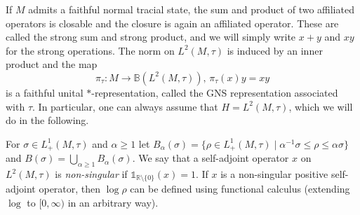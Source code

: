 \documentclass[12pt,a4paper]{amsart}
\newcommand{\1}{\mathds{1}}
\renewcommand{\L}{\mathcal L}
\newcommand{\IB}{\mathbb B}
\newcommand{\IR}{\mathbb R}
\theoremstyle{plain}
\newtheorem{lemma}[proposition]{Lemma}
\theoremstyle{definition}
\theoremstyle{remark}
\begin{document}
If $M$ admits a faithful normal tracial state, the sum and product of two affiliated operators is closable and the closure is again an affiliated operator. These are called the strong sum and strong product, and we will simply write $x+y$ and $xy$ for the strong operations. The norm on $L^2(M,\tau)$ is induced by an inner product and the map
\begin{equation*}
    \pi_\tau\colon M\to \IB(L^2(M,\tau)),\,\pi_\tau(x)y=xy
\end{equation*}
is a faithful unital $\ast$-representation, called the GNS representation associated with $\tau$. In particular, one can always assume that $H=L^2(M,\tau)$, which we will do in the following.

For $\sigma\in L^1_+(M,\tau)$ and $\alpha\geq 1$ let $B_\alpha(\sigma)=\{\rho\in L^1_+(M,\tau)\mid \alpha^{-1}\sigma\leq \rho\leq \alpha \sigma\}$ and $B(\sigma)=\bigcup_{\alpha\geq 1}B_\alpha(\sigma)$. We say that a self-adjoint operator $x$ on $L^2(M,\tau)$ is \emph{non-singular} if $\1_{\IR\setminus \{0\}}(x)=1$. If $x$ is a non-singular positive self-adjoint operator, then $\log \rho$ can be defined using functional calculus (extending $\log$ to $[0,\infty)$ in an arbitrary way).

%
\end{document}
